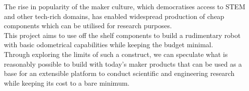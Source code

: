 
The rise in popularity of the maker culture, which democratises access to STEM and other tech-rich domains, has enabled widespread production of cheap components which can be utilised for research purposes.\\
This project aims to use off the shelf components to build a rudimentary robot with basic odometrical capabilities while keeping the budget minimal.\\
Through exploring the limits of such a construct, we can speculate what is reasonably possible to build with today's maker products that can
be used as a base for an extensible platform to conduct scientific and engineering research while keeping its cost to a bare minimum.
